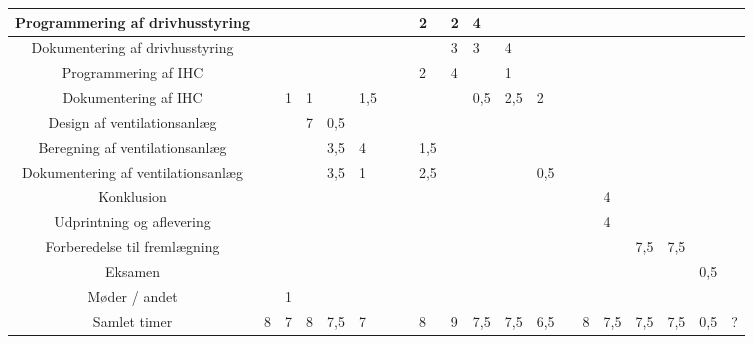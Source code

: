 \documentclass[12pt,a4paper,twoside,landscape]{article}
\begin{document}
\begin{tabular}[c]{|c||l|l|l|l|l|l|l||l|l|l|l|l|l|l||l|l|l|l|l|}
            Programmering af drivhusstyring     &&&&  & &&&2&2&4&&&&&&&&& \\ \hline
            Dokumentering af drivhusstyring     &&&&&&&&&3&3&4&&&&&&&& \\ \hline
            Programmering af IHC                && & &  &&&&2&4& &1&&&&&&&& \\ \hline
            Dokumentering af IHC                &&1&1&&1,5&&&&&0,5&2,5&2&&&&&&& \\ \hline
            Design af ventilationsanlæg         &&&7&0,5&&&&&&&&&&&&&&& \\ \hline
            Beregning af ventilationsanlæg      &&& &3,5&4&&&1,5&&&&&&&&&&& \\ \hline
            Dokumentering af ventilationsanlæg  &&&&3,5&1&&&2,5&&&&0,5&&&&&&& \\ \hline
            Konklusion                          &&&&&&&&&&&&&&&4&&&& \\ \hline
            Udprintning og aflevering           &&&&&&&&&&&&&&&4&&&& \\ \hline
            Forberedelse til fremlægning        &&&&&&&&&&&&&&&&7,5&7,5&& \\ \hline
            Eksamen                             &&&&&&&&&&&&&&&&&&0,5& \\ \hline
            Møder / andet                       & & 1 & & & & & & & & & & & & & & & & & \\ \hline
            \hline
            Samlet timer                        & 8 & 7 & 8 & 7,5 & 7 & & & 8 & 9 & 7,5 & 7,5 & 6,5 & & 8 & 7,5 & 7,5 & 7,5 & 0,5 & ?\\ \hline

\end{tabular}
\end{document}
